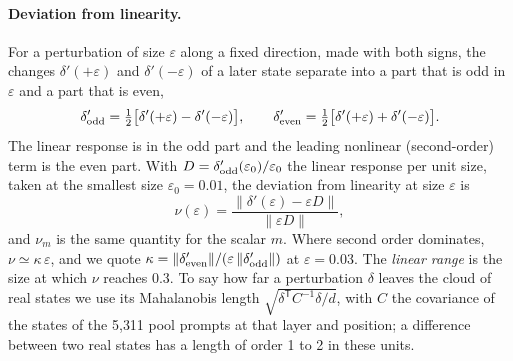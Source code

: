 \documentclass[11pt]{article}
\begin{document}
\paragraph{Deviation from linearity.} For a perturbation of size $\varepsilon$ along a fixed direction, made with both signs, the changes $\delta'(+\varepsilon)$ and $\delta'(-\varepsilon)$ of a later state separate into a part that is odd in $\varepsilon$ and a part that is even,
\begin{equation}
\delta'_{\rm odd}=\tfrac12\bigl[\delta'(+\varepsilon)-\delta'(-\varepsilon)\bigr],\qquad
\delta'_{\rm even}=\tfrac12\bigl[\delta'(+\varepsilon)+\delta'(-\varepsilon)\bigr].
\label{eq:oddeven}
\end{equation}
The linear response is in the odd part and the leading nonlinear (second-order) term is the even part. With $D=\delta'_{\rm odd}(\varepsilon_0)/\varepsilon_0$ the linear response per unit size, taken at the smallest size $\varepsilon_0=0.01$, the deviation from linearity at size $\varepsilon$ is
\begin{equation}
\nu(\varepsilon)=\frac{\lVert\delta'(\varepsilon)-\varepsilon D\rVert}{\lVert\varepsilon D\rVert},
\label{eq:nu}
\end{equation}
and $\nu_m$ is the same quantity for the scalar $m$. Where second order dominates, $\nu\simeq\kappa\,\varepsilon$, and we quote $\kappa=\lVert\delta'_{\rm even}\rVert/(\varepsilon\,\lVert\delta'_{\rm odd}\rVert)$ at $\varepsilon=0.03$. The \emph{linear range} is the size at which $\nu$ reaches 0.3. To say how far a perturbation $\delta$ leaves the cloud of real states we use its Mahalanobis length $\sqrt{\delta^{\mathsf T}C^{-1}\delta/d}$, with $C$ the covariance of the states of the 5{,}311 pool prompts at that layer and position; a difference between two real states has a length of order 1 to 2 in these units.
\end{document}
